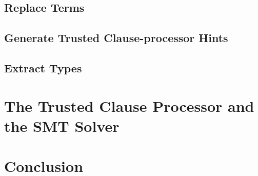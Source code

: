 \subsection{Replace Terms}

\subsection{Generate Trusted Clause-processor Hints}

\subsection{Extract Types}

\section{The Trusted Clause Processor and the SMT Solver}

\section{Conclusion}